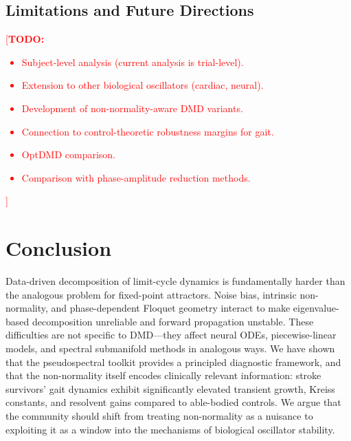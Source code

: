 \documentclass[12pt]{article}
\newcommand{\todo}[1]{\textcolor{red}{[\textbf{TODO:} #1]}}
\begin{document}
\subsection{Limitations and Future Directions}

\todo{
\begin{itemize}
  \item Subject-level analysis (current analysis is trial-level).
  \item Extension to other biological oscillators (cardiac, neural).
  \item Development of non-normality-aware DMD variants.
  \item Connection to control-theoretic robustness margins for gait.
  \item OptDMD comparison.
  \item Comparison with phase-amplitude reduction methods.
\end{itemize}}

\section{Conclusion}
\label{sec:conclusion}

Data-driven decomposition of limit-cycle dynamics is fundamentally harder
than the analogous problem for fixed-point attractors. Noise bias,
intrinsic non-normality, and phase-dependent Floquet geometry interact to
make eigenvalue-based decomposition unreliable and forward propagation
unstable. These difficulties are not specific to DMD---they affect neural
ODEs, piecewise-linear models, and spectral submanifold methods in
analogous ways. We have shown that the pseudospectral toolkit provides a
principled diagnostic framework, and that the non-normality itself encodes
clinically relevant information: stroke survivors' gait dynamics exhibit
significantly elevated transient growth, Kreiss constants, and resolvent
gains compared to able-bodied controls. We argue that the community should
shift from treating non-normality as a nuisance to exploiting it as a
window into the mechanisms of biological oscillator stability.


\end{document}
